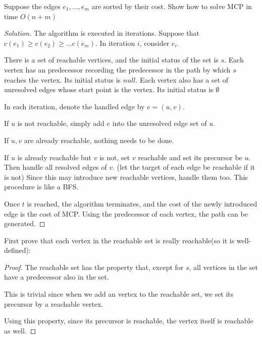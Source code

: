 


    \maketitle

    \begin{thm}{}{}
        Suppose the edges $e_1,\dots, e_m$ are sorted by their cost. Show how to solve MCP in time $O(n+m)$
    \end{thm}
    \begin{proof}[Solution]
        The algorithm is executed in iterations. Suppose that $c(e_1)\geq c(e_2)\geq\dots c(e_m)$. In iteration $i$, consider $e_i$. 

        There is a set of reachable vertices, and the initial status of the set is $s$. 
        Each vertex has an predecessor recording the predecessor in the path by which $s$ reaches the vertex. Its initial status is $null$. 
        Each vertex also has a set of unresolved edges whose start point is the vertex. Its initial status is $\emptyset$

        In each iteration, denote the handled edge by $e=(u,v)$. 

        If $u$ is not reachable, simply add $e$ into the unresolved edge set of $u$. 

        If $u,v$ are already reachable, nothing needs to be done. 
       
        If $u$ is already reachable but $v$ is not, set $v$ reachable and set its precursor be $u$. 
        Then handle all resolved edges of $v$. (let the target of each edge be reachable if it is not)
        Since this may introduce new reachable vertices, handle them too. This procedure is like a BFS. 

        Once $t$ is reached, the algorithm terminates, and the cost of the newly introduced edge is the cost of MCP. 
        Using the predecessor of each vertex, the path can be generated. 
    \end{proof}

        First prove that each vertex in the reachable set is really reachable(so it is well-defined): 
    \begin{proof}[Proof]
        The reachable set has the property that, except for $s$, all vertices in the set have a predecessor also in the set. 
        
        This is trivial since when we add an vertex to the reachable set, we set its precursor by a reachable vertex. 

        Using this property, since its precursor is reachable, the vertex itself is reachable as well. 
    \end{proof}

